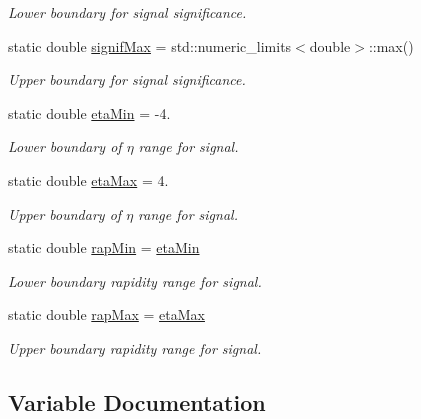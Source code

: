\begin{DoxyCompactItemize}
\begin{DoxyCompactList}\small\item\em Lower boundary for signal significance. \end{DoxyCompactList}\item 
static double \hyperlink{namespaceAnalysis_1_1Select_1_1CaloSignal_a2bb73d45f1bf8d8d81e7be8a8d247e47}{signif\+Max} = std\+::numeric\+\_\+limits$<$double$>$\+::max()
\begin{DoxyCompactList}\small\item\em Upper boundary for signal significance. \end{DoxyCompactList}\item 
static double \hyperlink{namespaceAnalysis_1_1Select_1_1CaloSignal_af20c529b123696be2ab71aaa25906edb}{eta\+Min} = -\/4.
\begin{DoxyCompactList}\small\item\em Lower boundary of $ \eta $ range for signal. \end{DoxyCompactList}\item 
static double \hyperlink{namespaceAnalysis_1_1Select_1_1CaloSignal_a24fdf3ac5549dff1f349eb1cb4146352}{eta\+Max} = 4.
\begin{DoxyCompactList}\small\item\em Upper boundary of $ \eta $ range for signal. \end{DoxyCompactList}\item 
static double \hyperlink{namespaceAnalysis_1_1Select_1_1CaloSignal_aa11187307efce66323ce38d6afdd75d7}{rap\+Min} = \hyperlink{namespaceAnalysis_1_1Select_1_1CaloSignal_af20c529b123696be2ab71aaa25906edb}{eta\+Min}
\begin{DoxyCompactList}\small\item\em Lower boundary rapidity range for signal. \end{DoxyCompactList}\item 
static double \hyperlink{namespaceAnalysis_1_1Select_1_1CaloSignal_a358398a6fbba8bcfd3f534ccbf838aa8}{rap\+Max} = \hyperlink{namespaceAnalysis_1_1Select_1_1CaloSignal_a24fdf3ac5549dff1f349eb1cb4146352}{eta\+Max}
\begin{DoxyCompactList}\small\item\em Upper boundary rapidity range for signal. \end{DoxyCompactList}\end{DoxyCompactItemize}


\subsection{Variable Documentation}

